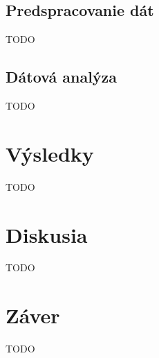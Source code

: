 \section{Predspracovanie dát}

TODO


\section{Dátová analýza}

TODO


\chapter{Výsledky}

TODO



\chapter{Diskusia}

TODO



\chapter{Záver}

TODO
